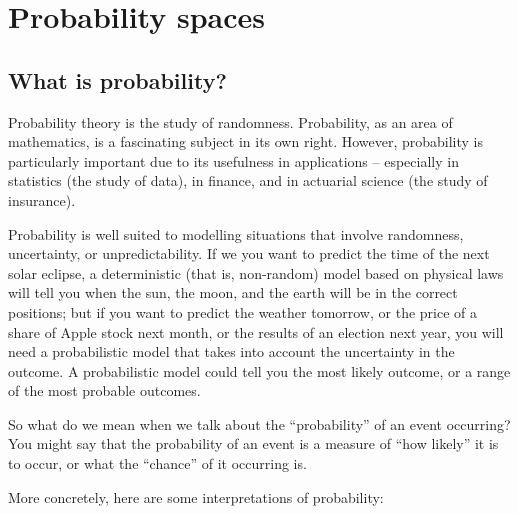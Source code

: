 \documentclass[
  a4paper,
]{book}
\theoremstyle{definition}
\theoremstyle{definition}
\theoremstyle{definition}
\theoremstyle{definition}
\theoremstyle{remark}
\begin{document}
\hypertarget{S02-probability}{%
\chapter{Probability spaces}\label{S02-probability}}

\renewcommand{\complement}{\mathsf{c}}
\newcommand{\comp}{\complement}

\hypertarget{what-is-prob}{%
\section{What is probability?}\label{what-is-prob}}

Probability theory is the study of randomness. Probability, as an area of mathematics, is a fascinating subject in its own right. However, probability is particularly important due to its usefulness in applications -- especially in statistics (the study of data), in finance, and in actuarial science (the study of insurance).

Probability is well suited to modelling situations that involve randomness, uncertainty, or unpredictability. If we you want to predict the time of the next solar eclipse, a deterministic (that is, non-random) model based on physical laws will tell you when the sun, the moon, and the earth will be in the correct positions; but if you want to predict the weather tomorrow, or the price of a share of Apple stock next month, or the results of an election next year, you will need a probabilistic model that takes into account the uncertainty in the outcome. A probabilistic model could tell you the most likely outcome, or a range of the most probable outcomes.

So what do we mean when we talk about the ``probability'' of an event occurring? You might say that the probability of an event is a measure of ``how likely'' it is to occur, or what the ``chance'' of it occurring is.

More concretely, here are some interpretations of probability:
\end{document}
